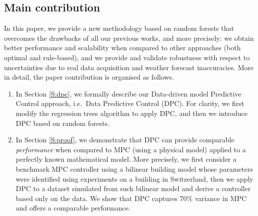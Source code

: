 \textcolor[rgb]{0,0,1}{
\subsection{Main contribution}
In this paper, we provide a new methodology based on random forests that overcomes the drawbacks of all our previous works, and more precisely: we obtain better performance and scalability when compared to other approaches (both optimal and rule-based), and we provide and validate robustness with respect to uncertainties due to real data acquisition and weather forecast inaccuracies. More in detail, the paper contribution is organised as follows.
\begin{enumerate}
	\item In Section \ref{S:dpc}, we formally describe our Data-driven model Predictive Control approach, i.e.~Data Predictive Control (DPC). For clarity, we first modify the regression trees algorithm to apply DPC, and then we introduce DPC based on random forests.
	\item In Section \ref{S:proof}, we demonstrate that DPC can provide comparable \textit{performance} when compared to MPC (using a physical model) applied to a perfectly known mathematical model. More precisely, we first consider a benchmark MPC controller using a bilinear building model whose parameters were identified using experiments on a building in Switzerland, then we apply DPC to a dataset simulated from such bilinear model and derive a controller based only on the data. We show that DPC captures 70\% variance in MPC and offers a comparable performance.

\end{enumerate}}
